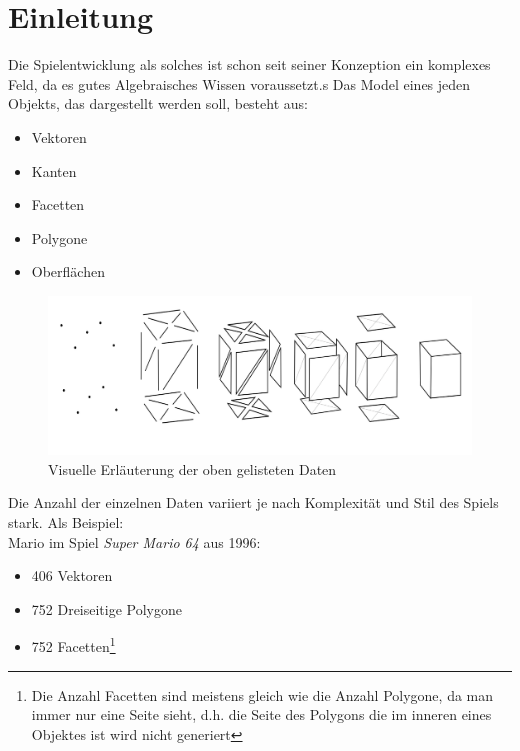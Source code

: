 \cleardoublepage
\chapter{Einleitung}
Die Spielentwicklung als solches ist schon seit seiner Konzeption ein komplexes Feld, da es gutes Algebraisches Wissen voraussetzt.s Das Model eines jeden Objekts, das dargestellt werden soll, besteht aus\cite{diverse_polygon_2021}:

\begin{itemize}[noitemsep,topsep=0pt,parsep=0pt,partopsep=0pt]
	\item Vektoren
	\item Kanten
	\item Facetten
	\item Polygone
	\item Oberflächen 
\end{itemize}

\begin{figure}[h]
	\includegraphics[width=13cm]{images/polygon_mesh}
	\caption{Visuelle Erläuterung\cite{diverse_polygon_2021} der oben gelisteten Daten}
	\label{fig:Visuelle Erläuterung nötiger Daten für ein 3D Quadrat}
\end{figure}

\newpage

Die Anzahl der einzelnen Daten variiert je nach Komplexität und Stil des Spiels stark. Als Beispiel\cite{astart_super_2017}: \\

Mario im Spiel \emph{Super Mario 64} aus 1996:
\begin{itemize}[noitemsep,topsep=0pt,parsep=0pt,partopsep=0pt]
	\item 406 Vektoren
	\item 752 Dreiseitige Polygone
	\item 752 Facetten\footnote{Die Anzahl Facetten sind meistens gleich wie die Anzahl Polygone, da man immer nur eine Seite sieht, d.h. die Seite des Polygons die im inneren eines Objektes ist wird nicht generiert}
\end{itemize}


